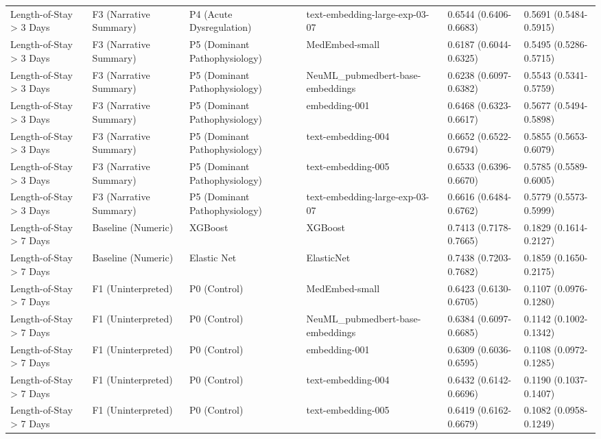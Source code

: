\begin{tabular}{llllll}
Length-of-Stay \textgreater{} 3 Days & F3 (Narrative Summary) & P4 (Acute Dysregulation) & text-embedding-large-exp-03-07 & 0.6544 (0.6406-0.6683) & 0.5691 (0.5484-0.5915) \\
Length-of-Stay \textgreater{} 3 Days & F3 (Narrative Summary) & P5 (Dominant Pathophysiology) & MedEmbed-small & 0.6187 (0.6044-0.6325) & 0.5495 (0.5286-0.5715) \\
Length-of-Stay \textgreater{} 3 Days & F3 (Narrative Summary) & P5 (Dominant Pathophysiology) & NeuML\_pubmedbert-base-embeddings & 0.6238 (0.6097-0.6382) & 0.5543 (0.5341-0.5759) \\
Length-of-Stay \textgreater{} 3 Days & F3 (Narrative Summary) & P5 (Dominant Pathophysiology) & embedding-001 & 0.6468 (0.6323-0.6617) & 0.5677 (0.5494-0.5898) \\
Length-of-Stay \textgreater{} 3 Days & F3 (Narrative Summary) & P5 (Dominant Pathophysiology) & text-embedding-004 & 0.6652 (0.6522-0.6794) & 0.5855 (0.5653-0.6079) \\
Length-of-Stay \textgreater{} 3 Days & F3 (Narrative Summary) & P5 (Dominant Pathophysiology) & text-embedding-005 & 0.6533 (0.6396-0.6670) & 0.5785 (0.5589-0.6005) \\
Length-of-Stay \textgreater{} 3 Days & F3 (Narrative Summary) & P5 (Dominant Pathophysiology) & text-embedding-large-exp-03-07 & 0.6616 (0.6484-0.6762) & 0.5779 (0.5573-0.5999) \\
Length-of-Stay \textgreater{} 7 Days & Baseline (Numeric) & XGBoost & XGBoost & 0.7413 (0.7178-0.7665) & 0.1829 (0.1614-0.2127) \\
Length-of-Stay \textgreater{} 7 Days & Baseline (Numeric) & Elastic Net & ElasticNet & 0.7438 (0.7203-0.7682) & 0.1859 (0.1650-0.2175) \\
Length-of-Stay \textgreater{} 7 Days & F1 (Uninterpreted) & P0 (Control) & MedEmbed-small & 0.6423 (0.6130-0.6705) & 0.1107 (0.0976-0.1280) \\
Length-of-Stay \textgreater{} 7 Days & F1 (Uninterpreted) & P0 (Control) & NeuML\_pubmedbert-base-embeddings & 0.6384 (0.6097-0.6685) & 0.1142 (0.1002-0.1342) \\
Length-of-Stay \textgreater{} 7 Days & F1 (Uninterpreted) & P0 (Control) & embedding-001 & 0.6309 (0.6036-0.6595) & 0.1108 (0.0972-0.1285) \\
Length-of-Stay \textgreater{} 7 Days & F1 (Uninterpreted) & P0 (Control) & text-embedding-004 & 0.6432 (0.6142-0.6696) & 0.1190 (0.1037-0.1407) \\
Length-of-Stay \textgreater{} 7 Days & F1 (Uninterpreted) & P0 (Control) & text-embedding-005 & 0.6419 (0.6162-0.6679) & 0.1082 (0.0958-0.1249) \\

\end{tabular}
